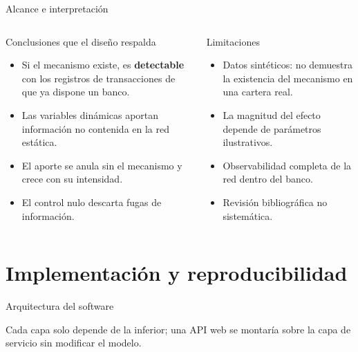\documentclass[aspectratio=169,10pt]{beamer}
\begin{document}
\begin{frame}{Alcance e interpretación}
\small
\begin{columns}[T]
\begin{exampleblock}{Conclusiones que el diseño respalda}
\begin{itemize}
\item Si el mecanismo existe, es \textbf{detectable} con los registros de
transacciones de que ya dispone un banco.
\item Las variables dinámicas aportan información no contenida en la red estática.
\item El aporte se anula sin el mecanismo y crece con su intensidad.
\item El control nulo descarta fugas de información.
\end{itemize}
\end{exampleblock}
\begin{alertblock}{Limitaciones}
\begin{itemize}
\item Datos sintéticos: no demuestra la existencia del mecanismo en una cartera real.
\item La magnitud del efecto depende de parámetros ilustrativos.
\item Observabilidad completa de la red dentro del banco.
\item Revisión bibliográfica no sistemática.
\end{itemize}
\end{alertblock}
\end{columns}
\end{frame}

\section{Implementación y reproducibilidad}

\begin{frame}{Arquitectura del software}
\centering
{}

\vspace{0.3cm}
\small Cada capa solo depende de la inferior; una API web se montaría sobre la capa de
servicio sin modificar el modelo.
\end{frame}
\end{document}
